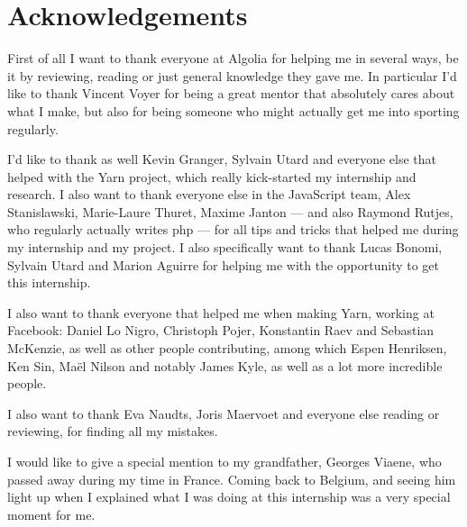 
\chapter{Acknowledgements}%
\label{chp:acknowledgements}

First of all I want to thank everyone at Algolia for helping me in several ways, be it by reviewing, reading or just general knowledge they gave me. In particular I'd like to thank Vincent Voyer for being a great mentor that absolutely cares about what I make, but also for being someone who might actually get me into sporting regularly.

I'd like to thank as well Kevin Granger, Sylvain Utard and everyone else that helped with the Yarn project, which really kick-started my internship and research. I also want to thank everyone else in the JavaScript team, Alex Stanislawski, Marie-Laure Thuret, Maxime Janton --- and also Raymond Rutjes, who regularly actually writes php --- for all tips and tricks that helped me during my internship and my project. I also specifically want to thank Lucas Bonomi, Sylvain Utard and Marion Aguirre for helping me with the opportunity to get this internship.

I also want to thank everyone that helped me when making Yarn, working at Facebook: Daniel Lo Nigro, Christoph Pojer, Konstantin Raev and Sebastian McKenzie, as well as other people contributing, among which Espen Henriksen, Ken Sin, Maël Nilson and notably James Kyle, as well as a lot more incredible people.

I also want to thank Eva Naudts, Joris Maervoet and everyone else reading or reviewing, for finding all my mistakes.

I would like to give a special mention to my grandfather, Georges Viaene, who passed away during my time in France. Coming back to Belgium, and seeing him light up when I explained what I was doing at this internship was a very special moment for me. 
